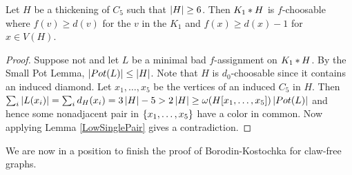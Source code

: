 \begin{lem}\label{TwoTwoOneTwoOne}
Let $H$ be a thickening of $C_5$ such that $\left|H\right| \geq 6$. Then
$K_1 \mbox{\hspace{2 pt}$\ast$\hspace{2 pt}} H$ is $f$-choosable where $f(v) \geq d(v)$ for the $v$ in the $K_1$
and $f(x) \geq d(x) - 1$ for $x \in V(H)$.
\end{lem}
\begin{proof}
Suppose not and let $L$ be a minimal bad $f$-assignment on $K_1 \mbox{\hspace{2 pt}$\ast$\hspace{2 pt}} H$. By
the Small Pot Lemma, $\left|Pot(L)\right| \leq \left|H\right|$. Note that $H$ is
$d_0$-choosable since it contains an induced diamond. 
Let $x_1, \ldots, x_5$ be the vertices of an induced $C_5$ in $H$.  Then $\sum_i
\left|L(x_i)\right| = \sum_i d_H(x_i) = 3\left|H\right| - 5 > 2\left|H\right| \geq \omega(H[x_1,
\ldots, x_5])\left|Pot(L)\right|$ and hence some nonadjacent pair in $\left\{ x_1, \ldots, x_5 \right\}$ have a color in
common.  Now applying Lemma \ref{LowSinglePair} gives a contradiction.
\end{proof}

We are now in a position to finish the proof of Borodin-Kostochka for claw-free
graphs.

